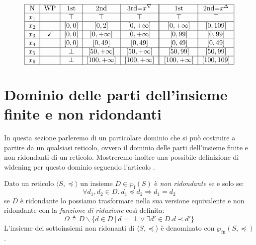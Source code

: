 \begin{example}
\begin{table}
\begin{minipage}{\textwidth}
\[\begin{tabular}{|c|c|c|c|c||c|c|c||}
        \hline 
        N & WP & 1st & 2nd & 3rd=$x^{\nabla}$ & 1st & 2nd=$x^{\Delta}$  \\
        \hline
        $x_1$ &  &  
            $\top$ & $\top$ & $\top$ & 
            $\top$ & $\top$ \\
        \hline
        $x_2$ &  & 
            $\left[0, 0\right]$ & $\left[0, 2\right]$ & $\left[0, +\infty \right]$ & 
            $\left[0, +\infty \right]$ & $\left[0, 109\right]$ \\
        \hline
        $x_3$ & \checkmark & 
            $\left[0, 0\right]$ & $\left[0, +\infty \right]$ & $\left[0, +\infty \right]$ & 
            $\left[0, 99\right]$ & $\left[0, 99\right]$ \\
        \hline
        $x_4$ &  & 
            $\left[0, 0\right]$ & $\left[0, 49\right]$ & $\left[0, 49\right]$ & 
            $\left[0, 49\right]$ & $\left[0, 49\right]$ \\
        \hline
        $x_5$ &  & 
            $\perp$ & $\left[50, +\infty \right]$ & $\left[50, +\infty \right]$ & 
            $\left[50, 99\right]$ & $\left[50, 99\right]$ \\
        \hline
        $x_6$ &  & 
            $\perp$ & $\left[100, +\infty \right]$ & $\left[100, +\infty \right]$ & 
            $\left[100, +\infty \right]$ & $\left[100, 109\right]$ \\
        \hline
        \end{tabular}
        \]
    \end{minipage}
    \caption{Tabella dei risultati dell'analisi di fase ascendente e discendente sul programma mostrato in Figura \ref{fig:codiceEsempio2}.}
    \label{fig:ris}
\end{table}
\end{example}

\section{Dominio delle parti dell'insieme finite e non ridondanti}\label{sec:EgliMilnerWidening}
In questa sezione parleremo di un particolare dominio che si può costruire a partire da un qualsiasi reticolo, ovvero il dominio delle parti dell'insieme finite e non ridondanti di un reticolo. Mostreremo inoltre una possibile definizione di widening per questo dominio seguendo l'articolo \cite{DBLP:journals/sttt/BagnaraHZ07}.

\iffalse
\noindent Dato un reticolo \(\langle S, \preceq \rangle\) un insieme \(D\in\wp_{\textrm{f}} (S)\) è \textit{non ridondante} se e solo se:
\[\forall d_1, d_2 \in D.\ d_1\preceq d_2\Rightarrow d_1=d_2\]
se \(D\) è ridondante lo possiamo trasformare nella sua versione equivalente e non ridondante con la \textit{funzione di riduzione} così definita:
\[\Omega \triangleq D \backslash \lbrace d \in D     \ \vert\ d= \perp \vee\ \exists d'\in D . d\prec d' \rbrace\]
L'insieme dei sottoinsiemi non ridonanti di \(\langle S, \preceq \rangle\) è denominato con \(\wp_{\textrm{fn}}(S, \preceq)\).

